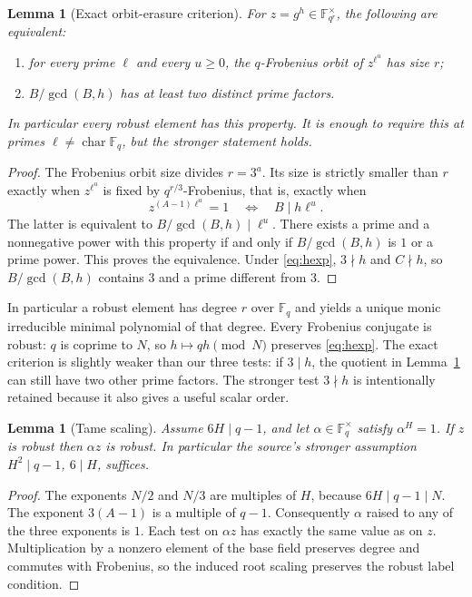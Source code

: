 \documentclass[11pt]{article}
\newtheorem{lemma}[theorem]{Lemma}
\theoremstyle{definition}\newtheorem{definition}[theorem]{Definition}
\newcommand{\F}{\mathbb F}\newcommand{\ord}{\operatorname{ord}}\newcommand{\Nrm}{\operatorname{N}}\newcommand{\vpp}{v_p}
\begin{document}
\begin{lemma}[Exact orbit-erasure criterion]\label{lem:erasure}
For $z=g^h\in\F_{q^r}^\times$, the following are equivalent:
\begin{enumerate}[label=(\roman*)]
\item for every prime $\ell$ and every $u\ge0$, the $q$-Frobenius orbit of $z^{\ell^u}$ has size $r$;
\item $B/\gcd(B,h)$ has at least two distinct prime factors.
\end{enumerate}
In particular every robust element has this property. It is enough to require this at primes $\ell\ne\operatorname{char}\F_q$, but the stronger statement holds.
\end{lemma}
\begin{proof}
The Frobenius orbit size divides $r=3^a$. Its size is strictly smaller than $r$ exactly when $z^{\ell^u}$ is fixed by $q^{r/3}$-Frobenius, that is, exactly when
\[
 z^{(A-1)\ell^u}=1\quad\Longleftrightarrow\quad B\mid h\ell^u.
\]
The latter is equivalent to $B/\gcd(B,h)\mid \ell^u$. There exists a prime and a nonnegative power with this property if and only if $B/\gcd(B,h)$ is $1$ or a prime power. This proves the equivalence. Under \eqref{eq:hexp}, $3\nmid h$ and $C\nmid h$, so $B/\gcd(B,h)$ contains $3$ and a prime different from $3$.
\end{proof}

In particular a robust element has degree $r$ over $\F_q$ and yields a unique monic irreducible minimal polynomial of that degree. Every Frobenius conjugate is robust: $q$ is coprime to $N$, so $h\mapsto qh\pmod N$ preserves \eqref{eq:hexp}. The exact criterion is slightly weaker than our three tests: if $3\mid h$, the quotient in Lemma~\ref{lem:erasure} can still have two other prime factors. The stronger test $3\nmid h$ is intentionally retained because it also gives a useful scalar order.

\begin{lemma}[Tame scaling]\label{lem:scale}
Assume $6H\mid q-1$, and let $\alpha\in\F_q^\times$ satisfy $\alpha^H=1$. If $z$ is robust then $\alpha z$ is robust. In particular the source's stronger assumption $H^2\mid q-1$, $6\mid H$, suffices.
\end{lemma}
\begin{proof}
The exponents $N/2$ and $N/3$ are multiples of $H$, because $6H\mid q-1\mid N$. The exponent $3(A-1)$ is a multiple of $q-1$. Consequently $\alpha$ raised to any of the three exponents is $1$. Each test on $\alpha z$ has exactly the same value as on $z$. Multiplication by a nonzero element of the base field preserves degree and commutes with Frobenius, so the induced root scaling preserves the robust label condition.
\end{proof}
\end{document}
